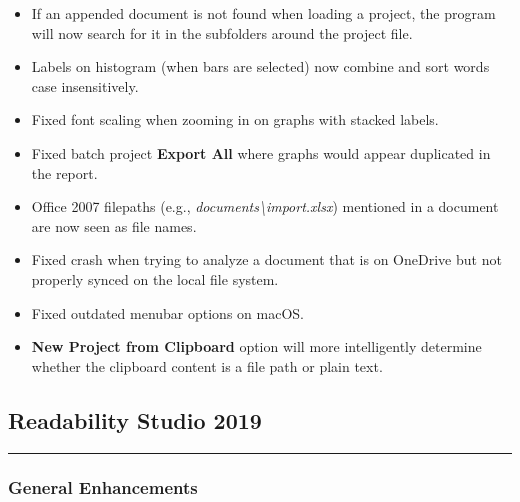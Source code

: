 \documentclass[
]{book}
\providecommand{\tightlist}{%
  \setlength{\itemsep}{0pt}\setlength{\parskip}{0pt}}
\theoremstyle{definition}
\theoremstyle{definition}
\theoremstyle{definition}
\theoremstyle{definition}
\theoremstyle{remark}
\begin{document}
\begin{itemize}
\tightlist
\item
  If an appended document is not found when loading a project, the program will now search for it in the subfolders around the project file.
\item
  Labels on histogram (when bars are selected) now combine and sort words case insensitively.
\item
  Fixed font scaling when zooming in on graphs with stacked labels.
\item
  Fixed batch project \textbf{Export All} where graphs would appear duplicated in the report.
\item
  Office 2007 filepaths (e.g., \emph{documents\textbackslash import.xlsx}) mentioned in a document are now seen as file names.
\item
  Fixed crash when trying to analyze a document that is on OneDrive but not properly synced on the local file system.
\item
  Fixed outdated menubar options on macOS.
\item
  \textbf{New Project from Clipboard} option will more intelligently determine whether the clipboard content is a file path or plain text.
\end{itemize}

\hypertarget{readability-studio-2019}{%
\subsection*{Readability Studio 2019}\label{readability-studio-2019}}

\begin{center}\rule{0.5\linewidth}{0.5pt}\end{center}

\hypertarget{general-enhancements-1}{%
\subsubsection*{General Enhancements}\label{general-enhancements-1}}
\end{document}
